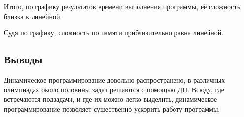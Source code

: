 \documentclass[12pt]{article}
\begin{document}
Итого, по графику результатов времени выполнения программы, её сложность близка к линейной.
\\


Судя по графику, сложность по памяти приблизительно равна линейной. \\

\subsection*{Выводы}

Динамическое программирование довольно распространено, в различных олимпиадах около половины задач решаются с помощью ДП. Всюду, где встречаются подзадачи, и где их можно легко выделить, динамическое программирование позволяет существенно ускорить работу программы. 
\end{document}
